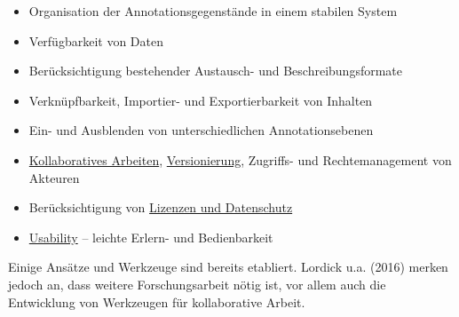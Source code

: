 \documentclass{article}
\begin{document}
        \begin{itemize}\item {Organisation der Annotationsgegenstände in einem stabilen System}\item {Verfügbarkeit von Daten}\item {Berücksichtigung bestehender Austausch- und Beschreibungsformate}\item {Verknüpfbarkeit, Importier- und Exportierbarkeit von Inhalten}\item {Ein- und Ausblenden von unterschiedlichen Annotationsebenen}\item {\href{http://gams.uni-graz.at/o:konde.104}{Kollaboratives Arbeiten}, \href{http://gams.uni-graz.at/o:konde.14}{Versionierung}, Zugriffs- und Rechtemanagement von Akteuren}\item {Berücksichtigung von \href{http://gams.uni-graz.at/o:konde.9}{Lizenzen und Datenschutz}}\item {\href{http://gams.uni-graz.at/o:konde.205}{Usability} – leichte Erlern- und Bedienbarkeit}\end{itemize}Einige Ansätze und Werkzeuge sind bereits etabliert. Lordick u.a.  (2016) merken jedoch an, dass weitere Forschungsarbeit nötig ist, vor allem auch die Entwicklung von Werkzeugen für kollaborative Arbeit.\\
            
\end{document}
